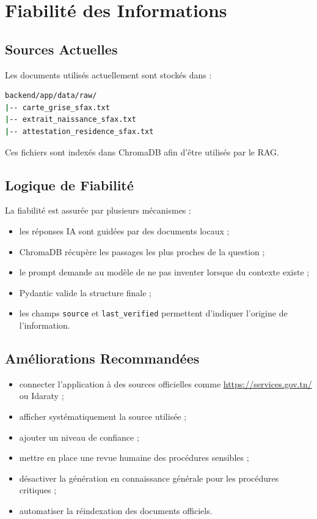 \documentclass[12pt,a4paper]{report}
\begin{document}
\chapter{Fiabilité des Informations}

\section{Sources Actuelles}

Les documents utilisés actuellement sont stockés dans :

\begin{lstlisting}[language=bash]
backend/app/data/raw/
|-- carte_grise_sfax.txt
|-- extrait_naissance_sfax.txt
|-- attestation_residence_sfax.txt
\end{lstlisting}

Ces fichiers sont indexés dans ChromaDB afin d'être utilisés par le RAG.

\section{Logique de Fiabilité}

La fiabilité est assurée par plusieurs mécanismes :

\begin{itemize}
    \item les réponses IA sont guidées par des documents locaux ;
    \item ChromaDB récupère les passages les plus proches de la question ;
    \item le prompt demande au modèle de ne pas inventer lorsque du contexte existe ;
    \item Pydantic valide la structure finale ;
    \item les champs \texttt{source} et \texttt{last\_verified} permettent d'indiquer l'origine de l'information.
\end{itemize}

\section{Améliorations Recommandées}

\begin{itemize}
    \item connecter l'application à des sources officielles comme \url{https://services.gov.tn/} ou Idaraty ;
    \item afficher systématiquement la source utilisée ;
    \item ajouter un niveau de confiance ;
    \item mettre en place une revue humaine des procédures sensibles ;
    \item désactiver la génération en connaissance générale pour les procédures critiques ;
    \item automatiser la réindexation des documents officiels.
\end{itemize}
\end{document}
